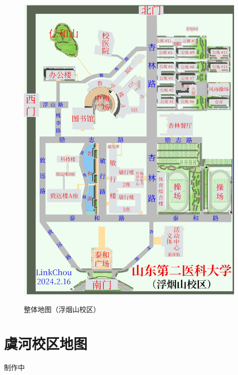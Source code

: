 \newpage
\begin{figure}[H]
    \centering
    \caption[map_all]{整体地图（浮烟山校区）}
    \vspace{1em}
    \includegraphics*[width=\textwidth]{浮烟山校区整体地图}
    \label{map_a}
\end{figure}

\newpage
\section[虞河校区地图]{虞河校区地图}
\begin{center}
    制作中
\end{center}

